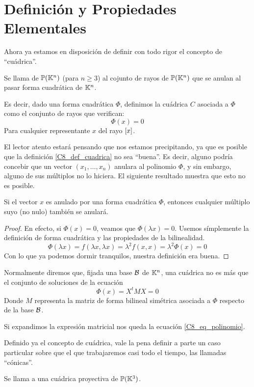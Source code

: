 \section{Definición y Propiedades Elementales}
Ahora ya estamos en disposición de definir con todo rigor el concepto de ``cuádrica''.
\begin{defi}[Cuádrica]
	\label{C8_def_cuadrica}
	Se llama  de $\mathbb{P}(\mathbb{K}^n)$ (para $n\geq 3$) al cojunto de rayos de $\mathbb{P}(\mathbb{K}^n)$ que se anulan al pasar forma cuadrática de $\mathbb{K}^n$.
	
	Es decir, dado una forma cuadrática $\Phi$, definimos la cuádrica $C$ asociada a $\Phi$ como el conjunto de rayos que verifican:
	\[\Phi(x)=0\]
	Para cualquier representante $x$ del rayo $\left [ x \right ]$.
\end{defi}
El lector atento estará pensando que nos estamos precipitando, ya que es posible que la definición \ref{C8_def_cuadrica} no sea ``buena''. Es decir, alguno podría concebir que un vector $(x_1,\dots,x_n)$ anulara al polinomio $\Phi$, y sin embargo, alguno de sus múltiplos no lo hiciera. El siguiente resultado muestra que esto no es posible.
\begin{lem}
	Si el vector $x$ es anulado por una forma cuadrática $\Phi$, entonces cualquier múltiplo suyo (no nulo) también se anulará.
\end{lem}
\begin{proof}
	En efecto, si $\Phi(x)=0$, veamos que $\Phi(\lambda x)=0$. Usemos símplemente la definición de forma cuadrática y las propiedades de la bilinealidad.
	\[\Phi(\lambda x)=f(\lambda x,\lambda x)=\lambda^2f(x,x)=\lambda^2\Phi(x)=0\]
	Con lo que ya podemos dormir tranquilos, nuestra definición era buena.
\end{proof}
\begin{obs}
	Normalmente diremos que, fijada una base $\mathcal{B}$ de $\mathbb{K}^n$, una cuádrica no es más que el conjunto de soluciones de la ecuación
	\begin{equation}
		\Phi(x)=X^tMX=0
	\end{equation}
	Donde $M$ representa la matriz de forma bilineal simétrica asociada a $\Phi$ respecto de la base $\mathcal{B}$.
	
	Si expandimos la expresión matricial nos queda la ecuación \eqref{C8_eq_polinomio}.
\end{obs}
Definido ya el concepto de cuádrica, vale la pena definir a parte un caso particular sobre que el que trabajaremos casi todo el tiempo, las llamadas ``cónicas''.
\begin{defi}[Cónica]
	Se llama  a una cuádrica proyectiva de $\mathbb{P}(\mathbb{K}^3)$.
\end{defi}
